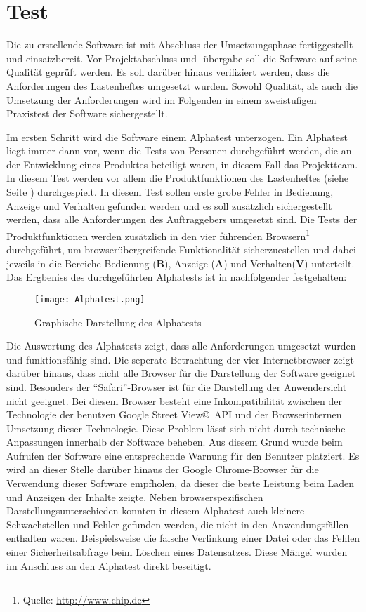 \section{Test}
\label{sec:Test}

Die zu erstellende Software ist mit Abschluss der Umsetzungsphase fertiggestellt und einsatzbereit. Vor Projektabschluss und -übergabe soll die Software auf seine Qualität geprüft werden. Es soll darüber hinaus verifiziert werden, dass die Anforderungen des Lastenheftes umgesetzt wurden. Sowohl Qualität, als auch die Umsetzung der Anforderungen wird im Folgenden in einem zweistufigen Praxistest der Software sichergestellt.

Im ersten Schritt wird die Software einem Alphatest unterzogen. Ein Alphatest liegt immer dann vor, wenn die Tests von Personen durchgeführt werden, die an der Entwicklung eines Produktes beteiligt waren, in diesem Fall das Projektteam. In diesem Test werden vor allem die Produktfunktionen des Lastenheftes (siehe Seite \pageref{sec:Lastenheft}) durchgespielt. In diesem Test sollen erste grobe Fehler in Bedienung, Anzeige und Verhalten gefunden werden und es soll zusätzlich sichergestellt werden, dass alle Anforderungen des Auftraggebers umgesetzt sind. Die Tests der Produktfunktionen werden zusätzlich in den vier führenden Browsern\footnote{Quelle: \url{http://www.chip.de}} durchgeführt, um browserübergreifende Funktionalität sicherzuestellen und dabei jeweils in die Bereiche Bedienung (\textbf{B}), Anzeige (\textbf{A}) und Verhalten(\textbf{V}) unterteilt. Das Ergbeniss des durchgeführten Alphatests ist in nachfolgender  festgehalten:

\begin{figure}[htb]
\centering
\texttt{[image: Alphatest.png]}
\caption[Mockup Backend]{Graphische Darstellung des Alphatests\protect\footnotemark}
\label{fig:Alphatest}
\end{figure}

Die Auswertung des Alphatests zeigt, dass alle Anforderungen umgesetzt wurden und funktionsfähig sind. Die seperate Betrachtung der vier Internetbrowser zeigt darüber hinaus, dass nicht alle Browser für die Darstellung der Software geeignet sind. Besonders der "`Safari"'-Browser ist für die Darstellung der Anwendersicht nicht geeignet. Bei diesem Browser besteht eine Inkompatibilität zwischen der Technologie der benutzen Google Street View\copyright\ API und der Browserinternen Umsetzung dieser Technologie. Diese Problem lässt sich nicht durch technische Anpassungen innerhalb der Software beheben. Aus diesem Grund wurde beim Aufrufen der Software eine entsprechende Warnung für den Benutzer platziert. Es wird an dieser Stelle darüber hinaus der Google Chrome-Browser für die Verwendung dieser Software empfholen, da dieser die beste Leistung beim Laden und Anzeigen der Inhalte zeigte. Neben browserspezifischen Darstellungsunterschieden konnten in diesem Alphatest auch kleinere Schwachstellen und Fehler gefunden werden, die nicht in den Anwendungsfällen enthalten waren. Beispielsweise die falsche Verlinkung einer Datei oder das Fehlen einer Sicherheitsabfrage beim Löschen eines Datensatzes. Diese Mängel wurden im Anschluss an den Alphatest direkt beseitigt.